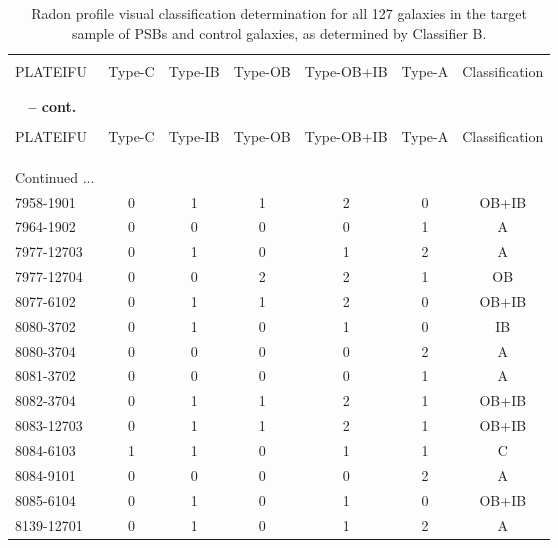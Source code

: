 

\begin{longtable}[c]{lcccccc}
\caption[Radon profile visual classification of PSBs and controls - Classifier B]{Radon profile visual classification determination for all 127 galaxies in the target sample of PSBs and control galaxies, as determined by Classifier B.}



\label{tab:visual-classification-B}\\
\hline
\\
PLATEIFU & Type-C & Type-IB & Type-OB & Type-OB+IB & Type-A & Classification \\
\\
\hline
\\
\endfirsthead
{{\bfseries \tablename\ \thetable{} -- cont.}}
\\
\hline
\\
PLATEIFU & Type-C & Type-IB & Type-OB & Type-OB+IB & Type-A & Classification \\
\\
\hline
\\
\endhead
%
\\
\hline 
{{Continued ...}}
\endfoot
\\
\hline
\endlastfoot
%
7958-1901 & 0 & 1 & 1 & 2 & 0 & OB+IB \\
7964-1902 & 0 & 0 & 0 & 0 & 1 & A \\
7977-12703 & 0 & 1 & 0 & 1 & 2 & A \\
7977-12704 & 0 & 0 & 2 & 2 & 1 & OB \\
8077-6102 & 0 & 1 & 1 & 2 & 0 & OB+IB \\
8080-3702 & 0 & 1 & 0 & 1 & 0 & IB \\
8080-3704 & 0 & 0 & 0 & 0 & 2 & A \\
8081-3702 & 0 & 0 & 0 & 0 & 1 & A \\
8082-3704 & 0 & 1 & 1 & 2 & 1 & OB+IB \\
8083-12703 & 0 & 1 & 1 & 2 & 1 & OB+IB \\
8084-6103 & 1 & 1 & 0 & 1 & 1 & C \\
8084-9101 & 0 & 0 & 0 & 0 & 2 & A \\
8085-6104 & 0 & 1 & 0 & 1 & 0 & OB+IB \\
8139-12701 & 0 & 1 & 0 & 1 & 2 & A \\

\end{longtable}
